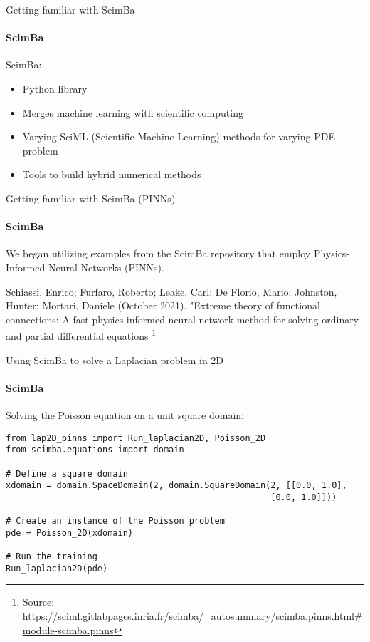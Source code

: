 \documentclass{beamer}
\begin{document}
\begin{frame}{Getting familiar with ScimBa}
\framesubtitle{ScimBa}

ScimBa:

    \begin{itemize}
        \item Python library
        \item Merges machine learning with scientific computing
        \item Varying SciML (Scientific Machine Learning) methods for varying PDE problem
        \item Tools to build hybrid numerical methods
    \end{itemize}
\end{frame}

\begin{comment}
     PINNs integrate PDEs into neural networks by creating a loss function that penalizes errors in fitting data and violating physical laws.
\end{comment}


\begin{frame}{Getting familiar with ScimBa (PINNs)}
\framesubtitle{ScimBa}

We began utilizing examples from the ScimBa repository that employ Physics-Informed Neural Networks (PINNs).

    \vfill
    \footnotesize{\scriptsize{Schiassi, Enrico; Furfaro, Roberto; Leake, Carl; De Florio, Mario; Johnston, Hunter; Mortari, Daniele (October 2021). "Extreme theory of functional connections: A fast physics-informed neural network method for solving ordinary and partial differential equations}}
     \footnote{\tiny{Source: \url{https://sciml.gitlabpages.inria.fr/scimba/_autosummary/scimba.pinns.html#module-scimba.pinns}}}
\end{frame}




\begin{frame}[fragile]{Using ScimBa to solve a Laplacian problem in 2D}
\framesubtitle{ScimBa}
Solving the Poisson equation on a unit square domain:

\begin{lstlisting}
from lap2D_pinns import Run_laplacian2D, Poisson_2D
from scimba.equations import domain

# Define a square domain
xdomain = domain.SpaceDomain(2, domain.SquareDomain(2, [[0.0, 1.0], 
                                                    [0.0, 1.0]]))

# Create an instance of the Poisson problem
pde = Poisson_2D(xdomain)

# Run the training
Run_laplacian2D(pde)

\end{lstlisting}


\end{frame}
\end{document}
